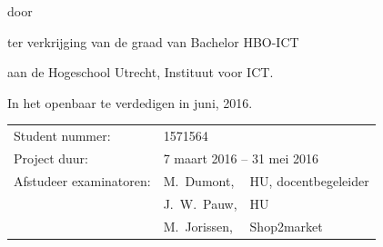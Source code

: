 \begin{titlepage}


\begin{center}


{\makeatletter
\largetitlestyle\fontsize{40}{60}\selectfont\@title
\makeatother}

{\makeatletter
\ifx\@subtitle\undefined\else
    \bigskip
   {\tudsffamily\fontsize{22}{32}\selectfont\@subtitle}    
\fi
\makeatother}

\bigskip
\bigskip

door

\bigskip
\bigskip

{\makeatletter
\largetitlestyle\fontsize{26}{26}\selectfont\@author
\makeatother}

\bigskip
\bigskip

ter verkrijging van de graad van Bachelor HBO-ICT

aan de Hogeschool Utrecht, Instituut voor ICT.

In het openbaar te verdedigen in juni, 2016.

\vfill

\begin{tabular}{lll}
    Student nummer: & 1571564 \\
    Project duur: & \multicolumn{2}{l}{7 maart 2016 -- 31 mei 2016} \\
    Afstudeer examinatoren:
        & M.\ Dumont, & HU, docentbegeleider \\
        & J.\ W.\ Pauw, & HU \\
        & M.\ Jorissen, & Shop2market
\end{tabular}




\end{center}


\end{titlepage}
